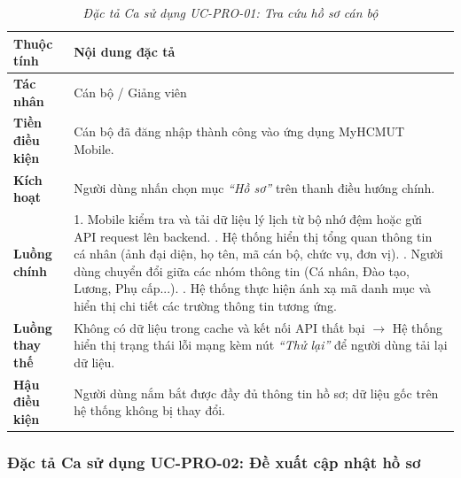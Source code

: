 \begin{table}[H]
\centering
\renewcommand{\arraystretch}{1.25}
\begin{tabularx}{\textwidth}{|p{3.2cm}|X|}
\hline
\textbf{Thuộc tính} & \textbf{Nội dung đặc tả} \\
\hline
\textbf{Tác nhân} & Cán bộ / Giảng viên \\
\hline
\textbf{Tiền điều kiện} & Cán bộ đã đăng nhập thành công vào ứng dụng MyHCMUT Mobile. \\
\hline
\textbf{Kích hoạt} & Người dùng nhấn chọn mục \textit{``Hồ sơ''} trên thanh điều hướng chính. \\
\hline
\textbf{Luồng chính} & 
1. Mobile kiểm tra và tải dữ liệu lý lịch từ bộ nhớ đệm hoặc gửi API request lên backend. \newline
2. Hệ thống hiển thị tổng quan thông tin cá nhân (ảnh đại diện, họ tên, mã cán bộ, chức vụ, đơn vị). \newline
3. Người dùng chuyển đổi giữa các nhóm thông tin (Cá nhân, Đào tạo, Lương, Phụ cấp...). \newline
4. Hệ thống thực hiện ánh xạ mã danh mục và hiển thị chi tiết các trường thông tin tương ứng. \\
\hline
\textbf{Luồng thay thế} & Không có dữ liệu trong cache và kết nối API thất bại $\rightarrow$ Hệ thống hiển thị trạng thái lỗi mạng kèm nút \textit{``Thử lại''} để người dùng tải lại dữ liệu. \\
\hline
\textbf{Hậu điều kiện} & Người dùng nắm bắt được đầy đủ thông tin hồ sơ; dữ liệu gốc trên hệ thống không bị thay đổi. \\
\hline
\end{tabularx}
\caption{\textit{Đặc tả Ca sử dụng UC-PRO-01: Tra cứu hồ sơ cán bộ}}
\label{tab:uc_pro_01}
\end{table}

\subsubsection{Đặc tả Ca sử dụng UC-PRO-02: Đề xuất cập nhật hồ sơ}

